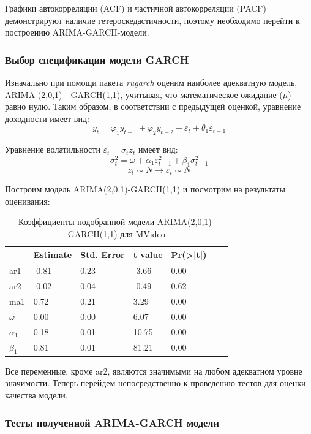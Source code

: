 \documentclass[a4paper,12pt,twoside]{article}
\begin{document}
Графики автокорреляции (ACF) и частичной автокорреляции (PACF) демонстрируют наличие гетероскедастичности, поэтому необходимо перейти к построению ARIMA-GARCH-модели.

\subsubsection{Выбор спецификации модели GARCH}

Изначально при помощи пакета \textit{rugarch} оценим наиболее адекватную модель, ARIMA (2,0,1) - GARCH(1,1), учитывая, что математическое ожидание ($\mu$) равно нулю.
Таким образом, в соответствии с предыдущей оценкой, уравнение доходности имеет вид:
$$
y_t = \varphi_1 y_{t-1} + \varphi_2 y_{t-2} + \varepsilon_t + \theta_1 \varepsilon_{t-1}
$$

Уравнение волатильности $ \varepsilon_t = \sigma_t z_t $ имеет вид:
$$
\sigma_t^2 = \omega + \alpha_1 \varepsilon_{t-1}^2 + \beta_1 \sigma_{t-1}^2
$$
$$
z_t \sim N \rightarrow \varepsilon_t \sim N
$$

Построим модель ARIMA(2,0,1)-GARCH(1,1) и посмотрим на результаты оценивания:

\begin{table}[!h]
\centering
\begin{tabular}{lllllll}
  \hline
          &  Estimate & Std. Error &  t value  &  Pr(>|t|) \\
  \hline
  ar1 & -0.81 &  0.23 & -3.66 & 0.00 \\
  ar2 & -0.02 &  0.04 & -0.49 & 0.62 \\
  ma1 & 0.72 &  0.21 & 3.29 & 0.00 \\
  $\omega$ & 0.00 &  0.00 & 6.07 & 0.00 \\
  $\alpha_1$ & 0.18 &  0.01 & 10.75 & 0.00 \\
  $\beta_1$ & 0.81 &  0.01 & 81.21 & 0.00 \\
  \hline
\end{tabular}
\caption{Коэффициенты подобранной модели ARIMA(2,0,1)-GARCH(1,1) для MVideo}
\end{table}

Все переменные, кроме ar2, являются значимыми на любом адекватном уровне значимости.
Теперь перейдем непосредственно к проведению тестов для оценки качества модели.

\subsubsection{Тесты полученной ARIMA-GARCH модели}
\end{document}
